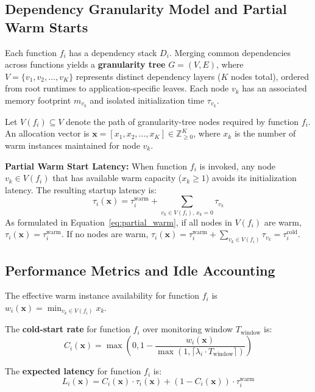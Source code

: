 \documentclass[final,5p,times,twocolumn]{elsarticle}
\begin{document}
\subsection{Dependency Granularity Model and Partial Warm Starts}

Each function $f_i$ has a dependency stack $D_i$. Merging common dependencies across functions yields a \textbf{granularity tree} $G = (V, E)$, where $V = \{v_1, v_2, \ldots, v_K\}$ represents distinct dependency layers ($K$ nodes total), ordered from root runtimes to application-specific leaves. Each node $v_k$ has an associated memory footprint $m_{v_k}$ and isolated initialization time $\tau_{v_k}$.

Let $V(f_i) \subseteq V$ denote the path of granularity-tree nodes required by function $f_i$. An allocation vector is $\mathbf{x} = [x_1, x_2, \ldots, x_K] \in \mathbb{Z}_{\geq 0}^K$, where $x_k$ is the number of warm instances maintained for node $v_k$.

\textbf{Partial Warm Start Latency:} When function $f_i$ is invoked, any node $v_k \in V(f_i)$ that has available warm capacity ($x_k \geq 1$) avoids its initialization latency. The resulting startup latency is:
\begin{equation}
\tau_i(\mathbf{x}) = \tau_i^{\text{warm}} + \sum_{v_k \in V(f_i), \, x_k = 0} \tau_{v_k}
\label{eq:partial_warm}
\end{equation}
As formulated in Equation~\eqref{eq:partial_warm}, if all nodes in $V(f_i)$ are warm, $\tau_i(\mathbf{x}) = \tau_i^{\text{warm}}$. If no nodes are warm, $\tau_i(\mathbf{x}) = \tau_i^{\text{warm}} + \sum_{v_k \in V(f_i)} \tau_{v_k} = \tau_i^{\text{cold}}$.

\subsection{Performance Metrics and Idle Accounting}

The effective warm instance availability for function $f_i$ is $w_i(\mathbf{x}) = \min_{v_k \in V(f_i)} x_k$.

The \textbf{cold-start rate} for function $f_i$ over monitoring window $T_{\text{window}}$ is:
\begin{equation}
C_i(\mathbf{x}) = \max\left(0, 1 - \frac{w_i(\mathbf{x})}{\max(1, \lceil \lambda_i \cdot T_{\text{window}} \rceil)}\right)
\end{equation}

The \textbf{expected latency} for function $f_i$ is:
\begin{equation}
L_i(\mathbf{x}) = C_i(\mathbf{x}) \cdot \tau_i(\mathbf{x}) + (1 - C_i(\mathbf{x})) \cdot \tau_i^{\text{warm}}
\end{equation}
\end{document}
